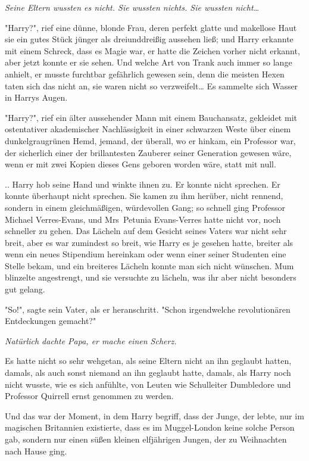 {\emph{Seine Eltern wussten es nicht. Sie wussten nichts. Sie wussten nicht…}

"Harry?", rief eine dünne, blonde Frau, deren perfekt glatte und makellose Haut sie ein gutes Stück jünger als dreiunddreißig aussehen ließ; und Harry erkannte mit einem Schreck, dass es Magie war, er hatte die Zeichen vorher nicht erkannt, aber jetzt konnte er sie sehen. Und welche Art von Trank auch immer so lange anhielt, er musste furchtbar gefährlich gewesen sein, denn die meisten Hexen taten sich das nicht an, sie waren nicht so verzweifelt… Es sammelte sich Wasser in Harrys Augen.

"Harry?", rief ein älter aussehender Mann mit einem Bauchansatz, gekleidet mit ostentativer akademischer Nachlässigkeit in einer schwarzen Weste über einem dunkelgraugrünen Hemd, jemand, der überall, wo er hinkam, ein Professor war, der sicherlich einer der brillantesten Zauberer seiner Generation gewesen wäre, wenn er mit zwei Kopien dieses Gens geboren worden wäre, statt mit null.

.. Harry hob seine Hand und winkte ihnen zu. Er konnte nicht sprechen. Er konnte überhaupt nicht sprechen. Sie kamen zu ihm herüber, nicht rennend, sondern in einem gleichmäßigen, würdevollen Gang; so schnell ging Professor Michael Verres-Evans, und Mrs~Petunia Evans-Verres hatte nicht vor, noch schneller zu gehen. Das Lächeln auf dem Gesicht seines Vaters war nicht sehr breit, aber es war zumindest so breit, wie Harry es je gesehen hatte, breiter als wenn ein neues Stipendium hereinkam oder wenn einer seiner Studenten eine Stelle bekam, und ein breiteres Lächeln konnte man sich nicht wünschen. Mum blinzelte angestrengt, und sie versuchte zu lächeln, was ihr aber nicht besonders gut gelang.

"So!", sagte sein Vater, als er heranschritt. "Schon irgendwelche revolutionären Entdeckungen gemacht?"

\emph{Natürlich dachte Papa, er mache einen Scherz.}

Es hatte nicht so sehr wehgetan, als seine Eltern nicht an ihn geglaubt hatten, damals, als auch sonst niemand an ihn geglaubt hatte, damals, als Harry noch nicht wusste, wie es sich anfühlte, von Leuten wie Schulleiter Dumbledore und Professor Quirrell ernst genommen zu werden.

Und das war der Moment, in dem Harry begriff, dass der Junge, der lebte, nur im magischen Britannien existierte, dass es im Muggel-London keine solche Person gab, sondern nur einen süßen kleinen elfjährigen Jungen, der zu Weihnachten nach Hause ging.

}
